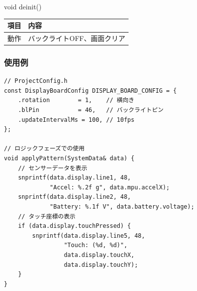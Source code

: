 \begin{funcblock}{void deinit()}
\begin{tabularx}{\textwidth}{l X}
\toprule
\textbf{項目} & \textbf{内容} \\
\midrule
動作   & バックライトOFF、画面クリア \\
\bottomrule
\end{tabularx}
\end{funcblock}

\subsubsection{使用例}

\begin{lstlisting}[style=cppstyle, caption={DisplayBoardModuleの使用例}]
// ProjectConfig.h
const DisplayBoardConfig DISPLAY_BOARD_CONFIG = {
    .rotation        = 1,    // 横向き
    .blPin           = 46,   // バックライトピン
    .updateIntervalMs = 100, // 10fps
};

// ロジックフェーズでの使用
void applyPattern(SystemData& data) {
    // センサーデータを表示
    snprintf(data.display.line1, 48,
             "Accel: %.2f g", data.mpu.accelX);
    snprintf(data.display.line2, 48,
             "Battery: %.1f V", data.battery.voltage);
    // タッチ座標の表示
    if (data.display.touchPressed) {
        snprintf(data.display.line5, 48,
                 "Touch: (%d, %d)",
                 data.display.touchX,
                 data.display.touchY);
    }
}
\end{lstlisting}
